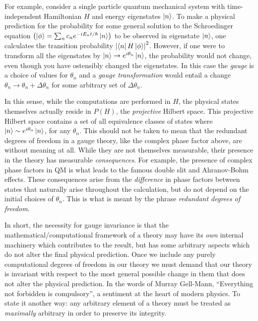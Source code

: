 For example, consider a single particle quantum mechanical system with time-independent Hamiltonian $H$ and energy eigenstates $\ket{n}$.
To make a physical prediction for the probability for some general solution to the Schroedinger equation $\left( \ket{\phi} = \sum_n c_n e^{-iE_nt / \hbar} \ket{n} \right)$ to be observed in eigenstate $\ket{n}$, one calculates the transition probability $\left| \bra{n} H \ket{\phi} \right|^2$.
However, if one were to transform all the eigenstates by $\ket{n} \rightarrow e^{i\theta_n} \ket{n}$, the probability would not change, even though you have ostensibly changed the eigenstates.
In this case the \textit{gauge} is a choice of values for $\theta_n$ and a \textit{gauge transformation} would entail a change $\theta_n \rightarrow \theta_n + \Delta\theta_n$ for some arbitrary set of $\Delta\theta_n$.

In this sense, while the computations are performed in $H$, the physical states themselves actually reside in $P(H)$, the \textit{projective} Hilbert space.
This projective Hilbert space contains a set of all equivalence classes of states where $\ket{n} \sim e^{i\theta_n}\ket{n}$, for any $\theta_n$.
This should not be taken to mean that the redundant degrees of freedom in a gauge theory, like the complex phase factor above, are without meaning at all. 
While they are not themselves measurable, their presence in the theory has measurable \textit{consequences}.
For example, the presence of complex phase factors in QM is what leads to the famous double slit and Ahranov-Bohm effects.
These consequences arise from the \textit{difference} in phase factors between states that naturally arise throughout the calculation, but do not depend on the initial choices of $\theta_n$. This is what is meant by the phrase \textit{redundant degrees of freedom}.

In short, the necessity for gauge invariance is that the mathematical/computational framework of a theory may have its \textit{own} internal machinery which contributes to the result, but has some arbitrary aspects which do not alter the final physical prediction.
Once we include any purely computational degrees of freedom in our theory we must demand that our theory is invariant with respect to the most general possible change in them that does not alter the physical prediction.
In the words of Murray Gell-Mann, ``Everything not forbidden is compulsory'', a sentiment at the heart of modern physics.
To state it another way: any arbitrary element of a theory must be treated as \textit{maximally} arbitrary in order to preserve its integrity.

